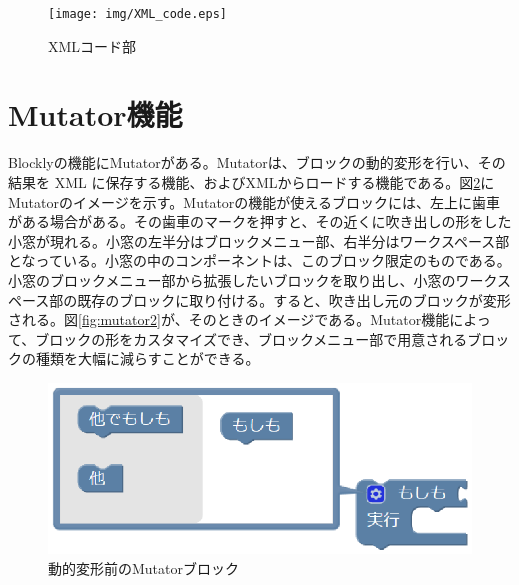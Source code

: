 \documentclass{risepaper}
\begin{document}



\begin{figure}[h]
\begin{center}
\texttt{[image: img/XML\_code.eps]}
\caption{XMLコード部}%
\label{fig:XML_code}
\end{center}%
\end{figure}%

   \section{Mutator機能}
   
Blocklyの機能にMutatorがある。Mutatorは、ブロックの動的変形を行い、その結果を XML に保存する機能、およびXMLからロードする機能である。図\ref{fig:mutator1}にMutatorのイメージを示す。Mutatorの機能が使えるブロックには、左上に歯車がある場合がある。その歯車のマークを押すと、その近くに吹き出しの形をした小窓が現れる。小窓の左半分はブロックメニュー部、右半分はワークスペース部となっている。小窓の中のコンポーネントは、このブロック限定のものである。小窓のブロックメニュー部から拡張したいブロックを取り出し、小窓のワークスペース部の既存のブロックに取り付ける。すると、吹き出し元のブロックが変形される。図\ref{fig:mutator2}が、そのときのイメージである。Mutator機能によって、ブロックの形をカスタマイズでき、ブロックメニュー部で用意されるブロックの種類を大幅に減らすことができる。

\begin{figure}[h]
\begin{center}
\includegraphics[scale=0.5]{img/mutator1.eps}
\caption{動的変形前のMutatorブロック}%
\label{fig:mutator1}
\end{center}%
\end{figure}%
\end{document}
